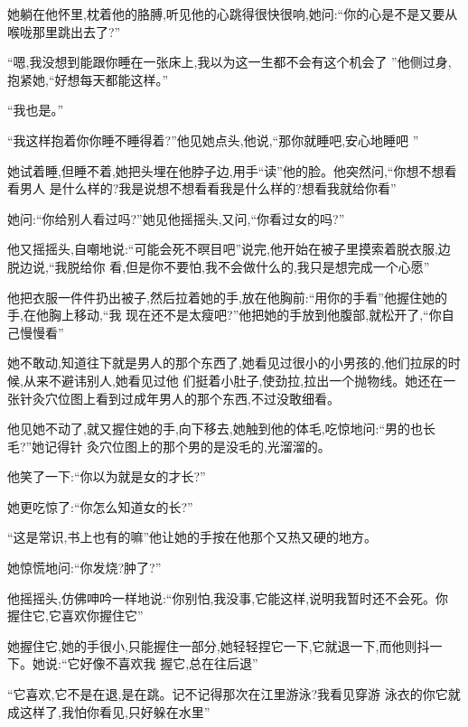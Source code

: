 ﻿\documentclass[12pt]{article}
\begin{document}
她躺在他怀里,枕着他的胳膊,听见他的心跳得很快很响,她问:``你的心是不是又要从喉咙那里跳出去了?''

``嗯,我\myrule 没想到\myrule 能跟你睡在一张床上,我以为\myrule 这一生都不会\myrule 有这个机会了
\myrule ''他侧过身,抱紧她,``好想\myrule 每天都能这样\myrule 。''

``我也是。''

``我这样\myrule 抱着你\myrule 你睡不睡得着?''他见她点头,他说,``那你就\myrule 睡吧,安心地睡吧\myrule 
''

她试着睡,但睡不着,她把头埋在他脖子边,用手``读''他的脸。他突然问,``你\myrule 想不想看看\myrule 男人
\myrule 是什么样的?我是说\myrule 想不想看看我是什么样的?想看\myrule 我就给你看\myrule ''

她问:``你\myrule 给别人看过吗?''她见他摇摇头,又问,``你\myrule 看过\myrule 女的吗?''

他又摇摇头,自嘲地说:``可能会死不暝目吧\myrule ''说完,他开始在被子里摸索着脱衣服,边脱边说,``我脱给你
看,但是你不要怕\myrule ,我不会\myrule 做什么的,我只是想\myrule 完成一个心愿\myrule ''

他把衣服一件件扔出被子,然后拉着她的手,放在他胸前:``用你的手看\myrule ''他握住她的手,在他胸上移动,``我
现在\myrule 还不是太瘦吧?''他把她的手放到他腹部,就松开了,``你\myrule 自己慢慢看\myrule ''

她不敢动,知道往下就是男人的那个东西了,她看见过很小的小男孩的,他们拉尿的时候,从来不避讳别人,她看见过他
们挺着小肚子,使劲拉,拉出一个抛物线。她还在一张针灸穴位图上看到过成年男人的那个东西,不过没敢细看。

他见她不动了,就又握住她的手,向下移去,她触到他的体毛,吃惊地问:``男的也\myrule 长\myrule 毛?''她记得针
灸穴位图上的那个男的是没毛的,光溜溜的。

他笑了一下:``你以为就是女的才长?''

她更吃惊了:``你怎么知道女的长\myrule ?''

``这是常识,书上也有的嘛\myrule ''他让她的手按在他那个又热又硬的地方。

她惊慌地问:``你\myrule 发烧?肿了?''

他摇摇头,仿佛呻吟一样地说:``你\myrule 别怕,我没事,它能这样,说明我\myrule 暂时还不会\myrule 死。你
\myrule 握住它,它\myrule 喜欢你\myrule 握住它\myrule ''

她握住它,她的手很小,只能握住一部分,她轻轻捏它一下,它就退一下,而他则抖一下。她说:``它好像不喜欢我
\myrule 握它,总在往后退\myrule ''

``它\myrule 喜欢,它不是在退,是在跳\myrule 。记不记得\myrule 那次\myrule 在江里游泳?我看见\myrule 穿游
泳衣的你\myrule 它就成\myrule 这样了,我\myrule 怕你\myrule 看见,只好躲在\myrule 水里\myrule ''
\end{document}
